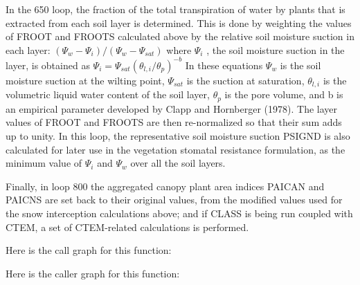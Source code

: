In the 650 loop, the fraction of the total transpiration of water by plants that is extracted from each soil layer is determined. This is done by weighting the values of F\+R\+O\+O\+T and F\+R\+O\+O\+T\+S calculated above by the relative soil moisture suction in each layer\+: $( \Psi_w - \Psi_i )/( \Psi_w - \Psi_{sat} )$ where $\Psi_i$ , the soil moisture suction in the layer, is obtained as $\Psi_i = \Psi_{sat} ( \theta_{l,i} / \theta_p )^{-b}$ In these equations $\Psi_w$ is the soil moisture suction at the wilting point, $\Psi_{sat}$ is the suction at saturation, $\theta_{l,i}$ is the volumetric liquid water content of the soil layer, $\theta_p$ is the pore volume, and b is an empirical parameter developed by Clapp and Hornberger (1978). The layer values of F\+R\+O\+O\+T and F\+R\+O\+O\+T\+S are then re-\/normalized so that their sum adds up to unity. In this loop, the representative soil moisture suction P\+S\+I\+G\+N\+D is also calculated for later use in the vegetation stomatal resistance formulation, as the minimum value of $\Psi_i$ and $\Psi_w$ over all the soil layers.

Finally, in loop 800 the aggregated canopy plant area indices P\+A\+I\+C\+A\+N and P\+A\+I\+C\+N\+S are set back to their original values, from the modified values used for the snow interception calculations above; and if C\+L\+A\+S\+S is being run coupled with C\+T\+E\+M, a set of C\+T\+E\+M-\/related calculations is performed.

Here is the call graph for this function\+:




Here is the caller graph for this function\+:


